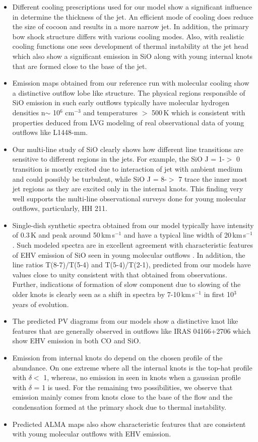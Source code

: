 \documentclass[useAMS,usenatbib]{mn2e}
\begin{document}
\begin{itemize}
\item Different cooling prescriptions used for our model show a
  significant influence in determine the thickness of the jet. An
  efficient mode of cooling does reduce the size of cocoon and results
  in a more narrow jet. In addition, the primary bow shock structure
  differs with various cooling modes. Also, with realistic cooling
  functions one sees development of
  thermal instability at the jet head which also show a significant emission in SiO
  along with young internal knots that are formed close to the base of
  the jet.
\item Emission maps obtained from our reference run with molecular
  cooling show a distinctive outflow lobe like structure. The
  physical regions responsible of SiO emission in such early outflows
  typically have molecular hydrogen densities n$\sim$ 10$^{6}$
  cm$^{-3}$ and temperatures $>$ 500\,K which is consistent with
  properties deduced from LVG modeling of real observational data of
  young outflows like L1448-mm.
\item Our multi-line study of SiO clearly shows how different
  line transitions are sensitive to different regions in the jets. For
  example, the SiO J = 1-$>$ 0 transition is mostly excited due to
  interaction of jet with ambient medium and could possibly be
  turbulent, while SiO J = 8-$>$ 7 trace the inner most jet regions as
  they are excited only in the internal knots. This finding very well
  supports the multi-line observational surveys done for young
  molecular outflows, particularly, HH 211.
\item Single-dish synthetic spectra obtained from our model typically
  have intensity of 0.3\,K and peak around 50\,km\,s$^{-1}$ and have a
  typical line width of 20\,km\,s$^{-1}$. Such modeled spectra are in
  excellent agreement with characteristic features of EHV emission of
  SiO seen in young molecular outflows . In addition, the line ratios 
  T(8-7)/T(5-4) and T(5-4)/T(2-1), predicted from our models have values close to
  unity consistent with that obtained from observations. Further,
  indications of formation of slow component due to slowing of the
  older knots is clearly seen as a shift in spectra by
  7-10\,km\,s$^{-1}$ in first 10$^{3}$ years of evolution.
\item The predicted PV diagrams from our models show a distinctive
  knot like features that are generally observed in outflows like IRAS
  04166+2706 which show EHV emission in both CO and SiO.
\item Emission from internal knots do depend on the chosen profile of
  the abundance. On one extreme where all the internal knots 
  is the top-hat profile with $\delta <$ 1, whereas, no emission in
  seen in knots when a gaussian profile with $\delta$ = 1 is used. For
  the remaining two possibilities, we observe that emission mainly
  comes from knots close to the base of the flow and the condensation
  formed at the primary shock due to thermal instability.
\item Predicted ALMA maps also show characteristic features that are
  consistent with young molecular outflows with EHV emission. 
\end{itemize}
\end{document}
